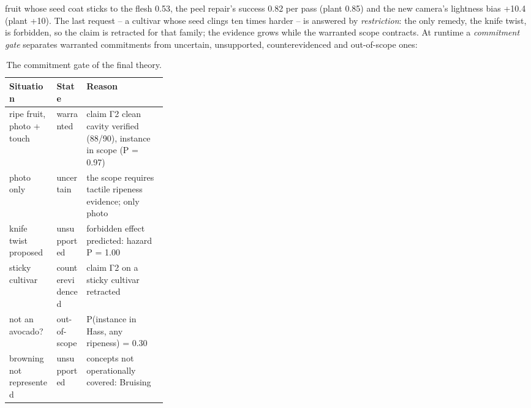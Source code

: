 \documentclass[10.5pt,a4paper]{article}
\begin{document}
fruit whose seed coat sticks to the flesh 0.53, the peel repair's success
0.82 per pass (plant 0.85) and the new camera's lightness bias +10.4 (plant +10). The last request -- a cultivar whose seed clings ten times harder -- is answered by
\emph{restriction}: the only remedy, the knife twist, is forbidden, so the claim is retracted for that family; the
evidence grows while the warranted scope contracts. At runtime a \emph{commitment gate} separates warranted
commitments from uncertain, unsupported, counterevidenced and out-of-scope ones:
\begin{table}[htbp]\centering\scriptsize\caption{The commitment gate of the final theory.}
\begin{tabularx}{\linewidth}{@{}p{0.3\linewidth}lX@{}}\toprule Situation & State & Reason \\\midrule
ripe fruit, photo + touch & warranted & claim Γ2 clean cavity verified (88/90), instance in scope (P = 0.97) \\
photo only & uncertain & the scope requires tactile ripeness evidence; only photo \\
knife twist proposed & unsupported & forbidden effect predicted: hazard P = 1.00 \\
sticky cultivar & counterevidenced & claim Γ2 on a sticky cultivar retracted \\
not an avocado? & out-of-scope & P(instance in Hass, any ripeness) = 0.30 \\
browning not represented & unsupported & concepts not operationally covered: Bruising \\\bottomrule\end{tabularx}\end{table}
\end{document}
